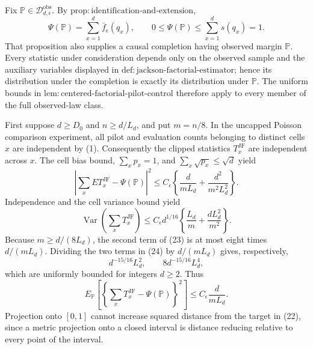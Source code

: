 Fix \(\mathbb P\in\mathcal D_{d,\epsilon}^{\mathrm{obs}}\).  By \(\mathrm{prop:identification\text{-}and\text{-}extension}\),
\[
 \Psi(\mathbb P)=\sum_{x=1}^d\bar f_\epsilon(q_x),
 \qquad 0\leq\Psi(\mathbb P)\leq\sum_{x=1}^ds(q_x)=1.
 \tag{22}
\]
That proposition also supplies a causal completion having observed margin \(\mathbb P\).  Every statistic under consideration depends only on the observed sample and the auxiliary variables displayed in \(\mathrm{def:jackson\text{-}factorial\text{-}estimator}\); hence its distribution under the completion is exactly its distribution under \(\mathbb P\).  The uniform bounds in \(\mathrm{lem:centered\text{-}factorial\text{-}pilot\text{-}control}\) therefore apply to every member of the full observed-law class.

First suppose \(d\geq D_0\) and \(n\geq d/L_d\), and put \(m=n/8\).  In the uncapped Poisson comparison experiment, all pilot and evaluation counts belonging to distinct cells \(x\) are independent by (1).  Consequently the clipped statistics \(T_x^{\mathrm{JF}}\) are independent across \(x\).  The cell bias bound, \(\sum_xp_x=1\), and \(\sum_x\sqrt{p_x}\leq\sqrt d\) yield
\[
 \left|\sum_xE T_x^{\mathrm{JF}}-\Psi(\mathbb P)\right|^2
 \leq C_\epsilon\left\{\frac d{mL_d}+\frac{d^2}{m^2L_d^2}\right\}.
 \tag{23}
\]
Independence and the cell variance bound yield
\[
 \operatorname{Var}\left(\sum_xT_x^{\mathrm{JF}}\right)
 \leq C_\epsilon d^{1/16}
 \left\{\frac{L_d}{m}+\frac{dL_d^2}{m^2}\right\}.
 \tag{24}
\]
Because \(m\geq d/(8L_d)\), the second term of (23) is at most eight times \(d/(mL_d)\).  Dividing the two terms in (24) by \(d/(mL_d)\) gives, respectively,
\[
 d^{-15/16}L_d^2,
 \qquad 8d^{-15/16}L_d^4,
\]
which are uniformly bounded for integers \(d\geq2\).  Thus
\[
 E_{\mathbb P}\left[
 \left\{\sum_xT_x^{\mathrm{JF}}-\Psi(\mathbb P)\right\}^2
 \right]
 \leq C_\epsilon\frac d{mL_d}.
 \tag{25}
\]
Projection onto \([0,1]\) cannot increase squared distance from the target in (22), since a metric projection onto a closed interval is distance reducing relative to every point of the interval.

